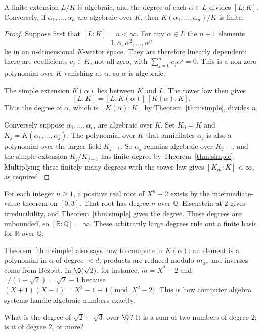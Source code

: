 \begin{corollary}\label{cor:finitealg}
A finite extension $L/K$ is algebraic, and the degree of each $\alpha\in L$ divides $[L:K]$. Conversely, if $\alpha_1,\dots,\alpha_n$ are algebraic over $K$, then $K(\alpha_1,\dots,\alpha_n)/K$ is finite.
\end{corollary}
\begin{proof}
Suppose first that $[L:K]=n<\infty$.
For any $\alpha\in L$ the $n+1$
elements
\[
1,\alpha,\alpha^2,\ldots,\alpha^n
\]
lie in an $n$-dimensional $K$-vector space.
They are therefore linearly dependent:
there are coefficients $c_j\in K$,
not all zero, with
$\sum_{j=0}^n c_j\alpha^j=0$.
This is a non-zero polynomial over
$K$ vanishing at $\alpha$, so
$\alpha$ is algebraic.

The simple extension $K(\alpha)$
lies between $K$ and $L$.
The tower law then gives
\[
[L:K]=[L:K(\alpha)]\,[K(\alpha):K].
\]
Thus the degree of $\alpha$,
which is $[K(\alpha):K]$ by
Theorem~\ref{thm:simple}, divides $n$.

Conversely suppose
$\alpha_1,\ldots,\alpha_m$ are algebraic
over $K$. Set $K_0=K$ and
$K_j=K(\alpha_1,\ldots,\alpha_j)$.
The polynomial over $K$ that annihilates
$\alpha_j$ is also a polynomial over
the larger field $K_{j-1}$.
So $\alpha_j$ remains algebraic
over $K_{j-1}$, and the simple
extension $K_j/K_{j-1}$ has finite
degree by Theorem~\ref{thm:simple}.
Multiplying these finitely many
degrees with the tower law gives
$[K_m:K]<\infty$, as required.
\end{proof}

For each integer $n\ge1$, a positive real root of $X^n-2$ exists by
the intermediate-value theorem on $[0,3]$. That root has degree
$n$ over $\mathbb Q$: Eisenstein at $2$ gives irreducibility, and
Theorem~\ref{thm:simple} gives the degree. These degrees are unbounded,
so $[\mathbb R:\mathbb Q]=\infty$. These arbitrarily large degrees rule out a finite basis for $\mathbb R$ over
$\mathbb Q$.

Theorem~\ref{thm:simple} also says how to compute in $K(\alpha)$: an element is a polynomial in $\alpha$ of degree $<d$, products are reduced modulo $m_\alpha$, and inverses come from Bézout. In $\Q(\sqrt2)$, for instance, $m=X^2-2$ and $1/(1+\sqrt2)=\sqrt2-1$ because $(X+1)(X-1)=X^2-1\equiv1\pmod{X^2-2}$. This is how computer algebra systems handle algebraic numbers exactly.

\begin{think}
What is the degree of $\sqrt2+\sqrt3$ over $\Q$? It is a sum of two numbers of degree $2$; is it of degree $2$, or more?
\end{think}

